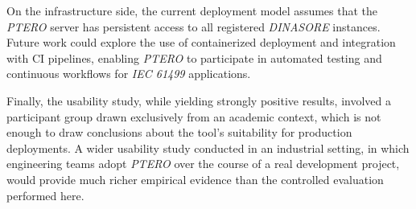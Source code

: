 On the infrastructure side, the current deployment model assumes that the \textit{PTERO} server has persistent access to all registered \textit{DINASORE} instances. Future work could explore the use of containerized deployment \cite{nikolakis_containerized_2020} and integration with \ac{CI} pipelines, enabling \textit{PTERO} to participate in automated testing and continuous workflows for \textit{IEC 61499} applications.

Finally, the usability study, while yielding strongly positive results, involved a participant group drawn exclusively from an academic context, which is not enough to draw conclusions about the tool's suitability for production deployments. A wider usability study conducted in an industrial setting, in which engineering teams adopt \textit{PTERO} over the course of a real development project, would provide much richer empirical evidence than the controlled evaluation performed here.
